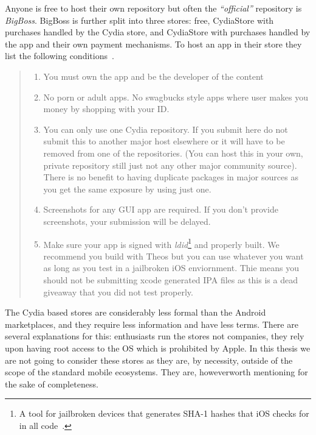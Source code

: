 \documentclass[thesis.tex]{subfiles}
\begin{document}
Anyone is free to host their own repository but often the \emph{``official''} repository is \emph{BigBoss}.
BigBoss is further split into three stores: free, CydiaStore with purchases handled by the Cydia store, and CydiaStore with purchases handled by the app and their own payment mechanisms.  To host an app in their store they list the following conditions~\cite{bigboss_host_2014}.

\begin{quotation}\noindent
  \begin{enumerate}
    \item You must own the app and be the developer of the content

    \item No porn or adult apps. No swagbucks style apps where user makes you money by shopping with your ID.

    \item You can only use one Cydia repository. If you submit here do not submit this to another major host elsewhere or it will have to be removed from one of the repositories. (You can host this in your own, private repository still just not any other major community source). There is no benefit to having duplicate packages in major sources as you get the same exposure by using just one.

    \item Screenshots for any GUI app are required. If you don't provide screenshots, your submission will be delayed.

    \item Make sure your app is signed with \emph{ldid}\footnote{A tool for jailbroken devices that generates SHA-1 hashes that iOS checks for in all code~\cite{saurik_code_nodate}.} and properly built. We recommend you build with Theos but you can use whatever you want as long as you test in a jailbroken iOS enviornment. Thie means you should not be submitting xcode generated IPA files as this is a dead giveaway that you did not test properly.
  \end{enumerate}
\end{quotation}

The Cydia based stores are considerably less formal than the Android marketplaces, and they require less information and have less terms.
There are several explanations for this: enthusiasts run the stores not companies, they rely upon having root access to the OS which is prohibited by Apple.  In this thesis we are not going to consider these stores as they are, by necessity, outside of the scope of the standard mobile ecosystems.  They are, howeverworth mentioning for the sake of completeness.
\end{document}
